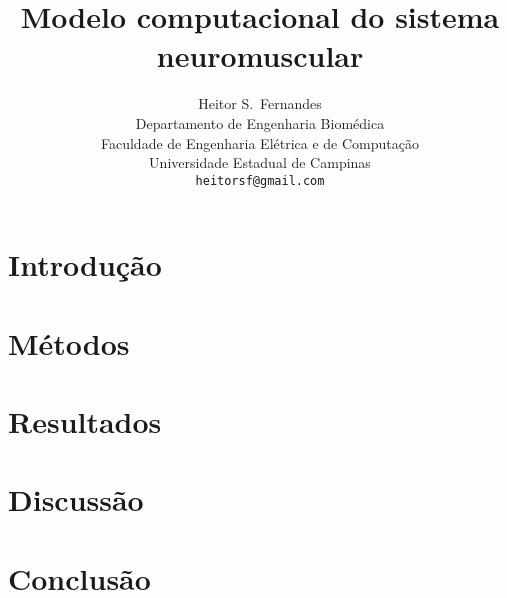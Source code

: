 \documentclass{article}
\title{Modelo computacional do sistema neuromuscular} %
\author{
  Heitor S.~Fernandes\\
  Departamento de Engenharia Biomédica\\
  Faculdade de Engenharia Elétrica e de Computação\\
  Universidade Estadual de Campinas\\
  \texttt{heitorsf@gmail.com} \\
}
\begin{document}
\maketitle

\begin{abstract}

\end{abstract}




\section{Introdução}


\section{Métodos}



\section{Resultados}


\section{Discussão}


\section{Conclusão}


  
\end{document}
